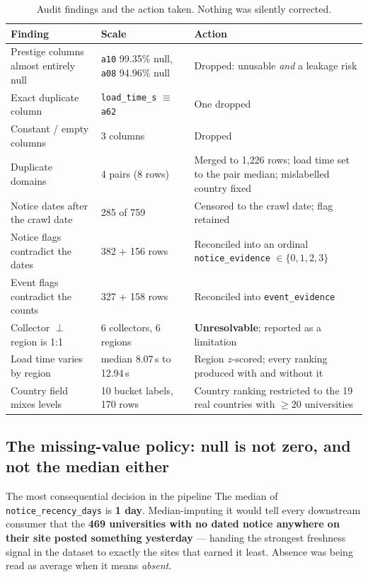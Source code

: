 \documentclass[11pt,a4paper]{article}
\begin{document}
\begin{table}[H]\centering\small
\caption{Audit findings and the action taken. Nothing was silently corrected.}
\begin{tabular}{p{5.6cm}p{3.0cm}p{6.2cm}}
\toprule
\textbf{Finding} & \textbf{Scale} & \textbf{Action} \\
\midrule
Prestige columns almost entirely null & \texttt{a10} 99.35\% null, \texttt{a08} 94.96\% null & Dropped: unusable \emph{and} a leakage risk \\
Exact duplicate column & \texttt{load\_time\_s} $\equiv$ \texttt{a62} & One dropped \\
Constant / empty columns & 3 columns & Dropped \\
Duplicate domains & 4 pairs (8 rows) & Merged to 1{,}226 rows; load time set to the pair median; mislabelled country fixed \\
Notice dates after the crawl date & 285 of 759 & Censored to the crawl date; flag retained \\
Notice flags contradict the dates & 382 + 156 rows & Reconciled into an ordinal \texttt{notice\_evidence} $\in \{0,1,2,3\}$ \\
Event flags contradict the counts & 327 + 158 rows & Reconciled into \texttt{event\_evidence} \\
Collector $\perp$ region is 1:1 & 6 collectors, 6 regions & \textbf{Unresolvable}; reported as a limitation \\
Load time varies by region & median 8.07\,s to 12.94\,s & Region $z$-scored; every ranking produced with and without it \\
Country field mixes levels & 10 bucket labels, 170 rows & Country ranking restricted to the 19 real countries with $\geq 20$ universities \\
\bottomrule
\end{tabular}
\end{table}

\subsection{The missing-value policy: null is not zero, and not the median either}

\begin{keybox}{The most consequential decision in the pipeline}
The median of \texttt{notice\_recency\_days} is \textbf{1 day}. Median-imputing it would tell
every downstream consumer that the \textbf{469 universities with no dated notice anywhere on
their site posted something yesterday} --- handing the strongest freshness signal in the
dataset to exactly the sites that earned it least. Absence was being read as average when it
means \emph{absent}.
\end{keybox}
\end{document}

